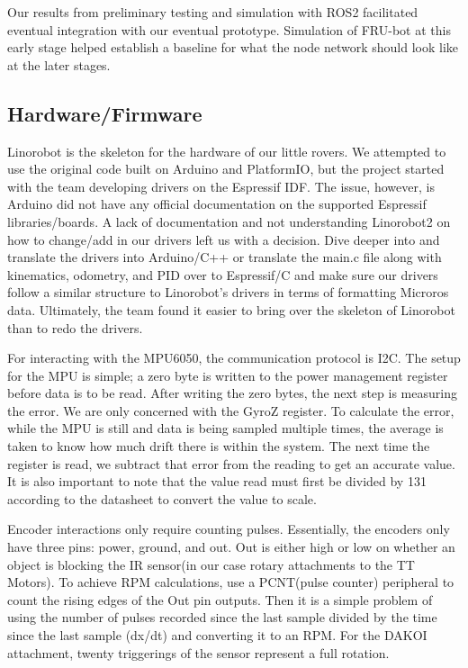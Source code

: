 \documentclass[conference]{IEEEtran}
\begin{document}
Our results from preliminary testing and simulation with ROS2 facilitated eventual integration with our eventual prototype. Simulation of FRU-bot at this early stage helped establish a baseline for what the node network should look like at the later stages.
\subsection{Hardware/Firmware}
Linorobot is the skeleton for the hardware of our little rovers. We attempted to use the original code built on Arduino and PlatformIO, but the project started with the team developing drivers on the Espressif IDF. The issue, however, is Arduino did not have any official documentation on the supported Espressif libraries/boards. A lack of documentation and not understanding Linorobot2 on how to change/add in our drivers left us with a decision. Dive deeper into and translate the drivers into Arduino/C++ or translate the main.c file along with kinematics, odometry, and PID over to Espressif/C and make sure our drivers follow a similar structure to Linorobot’s drivers in terms of formatting Microros data. Ultimately, the team found it easier to bring over the skeleton of Linorobot than to redo the drivers.

For interacting with the MPU6050, the communication protocol is I2C. The setup for the MPU is simple; a zero byte is written to the power management register before data is to be read. After writing the zero bytes, the next step is measuring the error. We are only concerned with the GyroZ register. To calculate the error, while the MPU is still and data is being sampled multiple times, the average is taken to know how much drift there is within the system. The next time the register is read, we subtract that error from the reading to get an accurate value. It is also important to note that the value read must first be divided by 131 according to the datasheet to convert the value to scale.

Encoder interactions only require counting pulses. Essentially, the encoders only have three pins: power, ground, and out. Out is either high or low on whether an object is blocking the IR sensor(in our case rotary attachments to the TT Motors). To achieve RPM calculations, use a PCNT(pulse counter) peripheral to count the rising edges of the Out pin outputs. Then it is a simple problem of using the number of pulses recorded since the last sample divided by the time since the last sample (dx/dt) and converting it to an RPM. For the DAKOI attachment, twenty triggerings of the sensor represent a full rotation.
\end{document}
